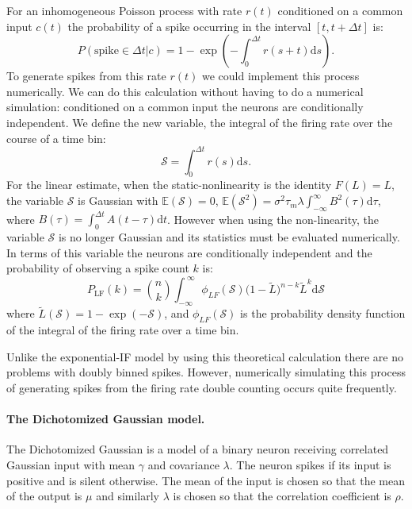 \documentclass[%
 reprint,
 amsmath,amssymb,
 aps,
floatfix,
]{revtex4-1}
\newcommand{\dd}{\mathrm{d}}
\begin{document}
For an inhomogeneous Poisson process with rate $r(t)$ conditioned on a common input $c(t)$ the probability of a spike occurring in the interval $[t,t+\Delta t]$ is:
\begin{equation}
P(\text{spike}\in\Delta t | c ) = 1 - \exp{\left(-\int_0^{\Delta t} \! r(s+t) \dd s \right)}.
\end{equation}
To generate spikes from this rate $r(t)$ we could implement this process numerically. We can do this calculation without having to do a numerical simulation: conditioned on a common input the neurons are conditionally independent. We define the new variable, the integral of the firing rate over the course of a time bin:
\begin{equation}
\mathcal{S} = \int_0^{\Delta t} \! r(s) \dd s.
\end{equation}
For the linear estimate, when the static-nonlinearity is the identity $F(L) = L$, the variable $\mathcal{S}$ is Gaussian with $\mathbb{E}(\mathcal{S}) = 0$, $\mathbb{E}(\mathcal{S}^2) = \sigma^2 \tau_m \lambda \int_{-\infty}^{\infty} B^2 (\tau) \dd \tau$, where $B(\tau) = \int_0^{\Delta t} A(t-\tau) \dd t$. However when using the non-linearity, the variable $\mathcal{S}$ is no longer Gaussian and its statistics must be evaluated numerically.
In terms of this variable the neurons are conditionally independent and the probability of observing a spike count $k$ is:
\begin{equation}
P_{\text{LF}}(k) = \binom{n}{k} \int_{-\infty}^{~\infty} \phi_{LF}(\mathcal{S}) \big(1-\tilde{L}\big)^{n-k} \tilde{L}^{k} \dd \mathcal{S}
\end{equation}
where $\tilde{L}(\mathcal{S}) = 1-\exp(-\mathcal{S})$, and $\phi_{LF}(\mathcal{S})$ is the probability density function of the integral of the firing rate over a time bin.

Unlike the exponential-IF model by using this theoretical calculation there are no problems with doubly binned spikes. However, numerically simulating this process of generating spikes from the firing rate double counting occurs quite frequently.
 
\paragraph*{The Dichotomized Gaussian model.}
The Dichotomized Gaussian is a model of a binary neuron receiving correlated Gaussian input with mean $\gamma$ and covariance $\lambda$. The neuron spikes if its input is positive and is silent otherwise. The mean of the input is chosen so that the mean of the output is $\mu$ and similarly $\lambda$ is chosen so that the correlation coefficient is $\rho$.
\end{document}

